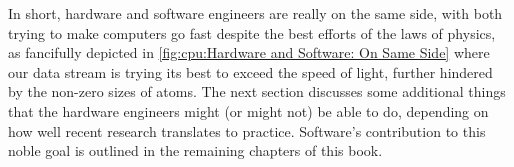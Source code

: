 In short, hardware and software engineers are really on the same side,
with both trying to make computers go fast despite the best efforts of
the laws of physics, as fancifully depicted in
\cref{fig:cpu:Hardware and Software: On Same Side}
where our data stream is trying its best to exceed the speed of light,
further hindered by the non-zero sizes of atoms.
The next section discusses some additional things that the hardware engineers
might (or might not) be able to do, depending on how well recent
research translates to practice.
Software's contribution to this noble goal is outlined in the remaining
chapters of this book.
